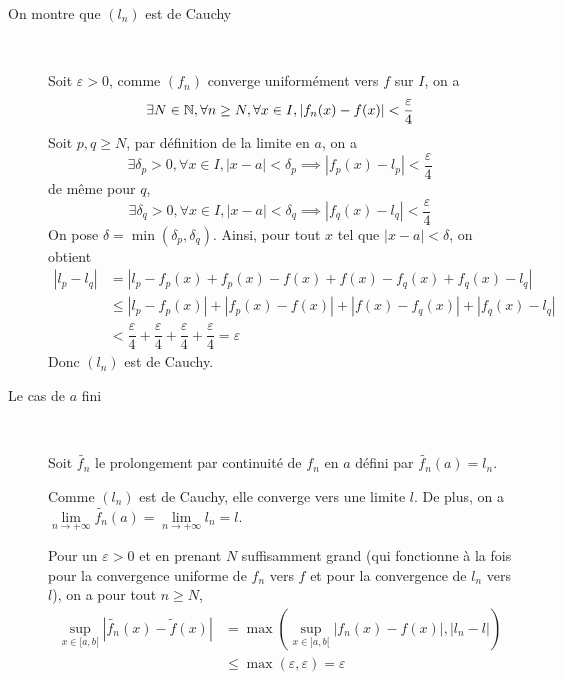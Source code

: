 \documentclass[a4paper,12pt]{article}
\begin{document}
\begin{demonstration}
    \begin{description}
        \item[On montre que $(l_n)$ est de Cauchy]~\par
        Soit $\varepsilon > 0$, comme $(f_n)$ converge uniformément vers $f$ sur $I$, on a
        $$
        \exists N \in \mathbb{N}, \forall n \geq N, \forall x \in I, |f_n(x) - f(x)| < \dfrac{\varepsilon}{4}
        $$
        Soit $p, q \geq N$, par définition de la limite en $a$, on a
        $$
        \exists \delta_p > 0, \forall x \in I, |x - a| < \delta_p \implies |f_p(x) - l_p| < \dfrac{\varepsilon}{4}
        $$
        de même pour $q$,
        $$
        \exists \delta_q > 0, \forall x \in I, |x - a| < \delta_q \implies |f_q(x) - l_q| < \dfrac{\varepsilon}{4}
        $$
        On pose $\delta = \min(\delta_p, \delta_q)$.
        Ainsi, pour tout $x$ tel que $|x - a| < \delta$, on obtient
        \begin{align*}
            |l_p - l_q| &= |l_p - f_p(x) + f_p(x) - f(x) + f(x) - f_q(x) + f_q(x) - l_q| \\
            &\leq |l_p - f_p(x)| + |f_p(x) - f(x)| + |f(x) - f_q(x)| + |f_q(x) - l_q| \\
            &< \dfrac{\varepsilon}{4} + \dfrac{\varepsilon}{4} + \dfrac{\varepsilon}{4} + \dfrac{\varepsilon}{4} = \varepsilon
        \end{align*}
        Donc $(l_n)$ est de Cauchy.
        
        \item[Le cas de $a$ fini]~\par
        Soit $\tilde{f_n}$ le prolongement par continuité de $f_n$ en $a$ défini par $\tilde{f_n}(a) = l_n$.

        Comme $(l_n)$ est de Cauchy, elle converge vers une limite $l$.
        De plus, on a $\lim\limits_{n \to +\infty} \tilde{f_n}(a) = \lim\limits_{n \to +\infty} l_n = l$.

        Pour un $\varepsilon > 0$ et en prenant $N$ suffisamment grand (qui fonctionne à la fois pour la convergence uniforme de $f_n$ vers $f$ et pour la convergence de $l_n$ vers $l$), on a pour tout $n \geq N$,
        \begin{align*}
            \sup_{x \in [a, b[} |\tilde{f_n}(x) - \tilde{f}(x)| &= \max \left( \sup_{x \in ]a, b[} |f_n(x) - f(x)|, |l_n - l| \right) \\
            &\leq \max \left( \varepsilon, \varepsilon \right) = \varepsilon
        \end{align*}
            

\end{description}
\end{demonstration}
\end{document}
